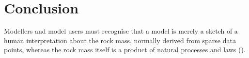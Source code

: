 \chapter{Conclusion}

Modellers and model users must recognise that a model is merely a sketch of a human interpretation about the rock mass, normally derived from sparse data points, whereas the rock mass itself is a product of natural processes and laws (\cite{zorzi20253d}).